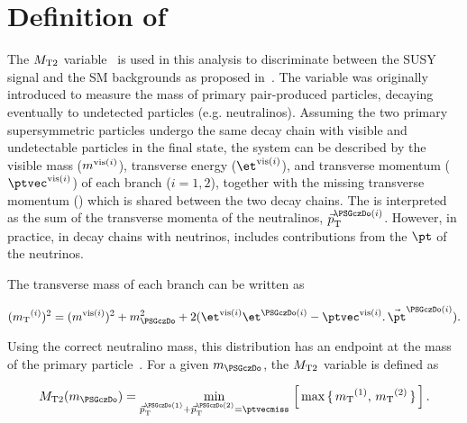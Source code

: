 \section{\texorpdfstring{Definition of \mttwo}{Definition of MT2}}
\label{sect:mt2def}
The ${M_{\rm T2}}$ variable~\cite{Lester:1999tx,Barr:2003rg} is used in this analysis to discriminate between the SUSY signal and the SM backgrounds as proposed in~\cite{Barr:2009wu}. The variable was originally introduced to measure the mass of primary pair-produced particles, decaying eventually to undetected particles (e.g. neutralinos). Assuming the two primary supersymmetric particles undergo the same decay chain with visible and undetectable particles in the final state, the system can be described by the visible mass ($m^{{\rm vis}(i)}$), transverse energy ($\etvisi$), and transverse momentum ($\vptvisi$) of each branch ($i=1,2$), together with the 
missing transverse momentum (\ptvecmiss) which is shared between the two decay chains. The \ptvecmiss is interpreted as the sum of the transverse momenta
of the neutralinos, $\vec{p}_{\rm T}^{\PSGczDo(i)}$.
However, in practice, in decay chains with neutrinos, \ptvecmiss includes contributions from the $\pt$ of the neutrinos.

The transverse mass of each branch can be written as 
\begin{linenomath}
\begin{equation}
\label{eq:mtdef}
(\mt^{(i)})^{2}= (\mvisi)^2+m^2_{\PSGczDo}+2(\etvisi\et^{\PSGczDo(i)}-{\vptvisi}.\,{\vec{\pt}^{\PSGczDo(i)}}).
\end{equation}
\end{linenomath}

\noindent Using the correct neutralino mass, this distribution has an endpoint at the mass of the primary particle~\cite{Arnison:1983rp,Banner:1983jy,Affolder:2000bpa,Abazov:2002bu}. 
For a given $m_{\PSGczDo}$, the ${M_{\rm T2}}$ variable is defined as
\begin{linenomath}
\begin{equation}
\label{eq:mt2def}
\mttwo(m_{\PSGczDo})= \min_{\vec{p}_{\rm T}^{\PSGczDo(1)}+\vec{p}_{\rm T}^{\PSGczDo(2)}=\ptvecmiss}\,\left[\,\max\,\{ \, \mt^{(1)},\,\mt^{(2)}\,\}\,\right].
\end{equation}
\end{linenomath}

